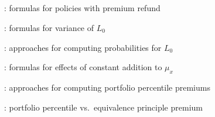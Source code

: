 \subsection*{}
\item {}: formulas for policies with premium refund
\item {}: formulas for variance of \(L_0\)
\item {}: approaches for computing probabilities for \(L_0\)
\item {}: formulas for effects of constant addition to \(\mu_x\)
\item {}: approaches for computing portfolio percentile premiums
\item {}: portfolio percentile vs.\
equivalence principle premium
